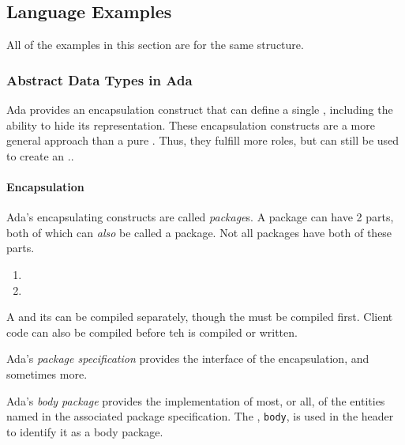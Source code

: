 \subsection{Language Examples}\label{subsec:Abstract_Data_Type_Lang_Examples}
All of the examples in this section are for the same structure.

\subsubsection{Abstract Data Types in Ada}\label{subsubsec:Abstract_Data_Types_Ada}
Ada provides an encapsulation construct that can define a single , including the ability to hide its representation.
These encapsulation constructs are a more general approach than a pure .
Thus, they fulfill more roles, but can still be used to create an ..

\paragraph{Encapsulation}\label{par:Ada_Encapsulation}
\begin{definition}[Package]\label{def:Ada_Package}
  Ada's encapsulating constructs are called \emph{package}s.
  A package can have 2 parts, both of which can \textit{also} be called a package.
  Not all packages have both of these parts.
  \begin{enumerate}[noitemsep]
  \item {}
  \item {}
  \end{enumerate}

  A  and its  can be compiled separately, though the  must be compiled first.
  Client code can also be compiled before teh  is compiled or written.
\end{definition}

\begin{definition}\label{def:Ada_Package_Specification}
  Ada's \emph{package specification} provides the interface of the encapsulation, and sometimes more.
\end{definition}

\begin{definition}\label{def:Ada_Body_Package}
  Ada's \emph{body package} provides the implementation of most, or all, of the entities named in the associated package specification.
  The , \texttt{body}, is used in the header to identify it as a body package.
\end{definition}

